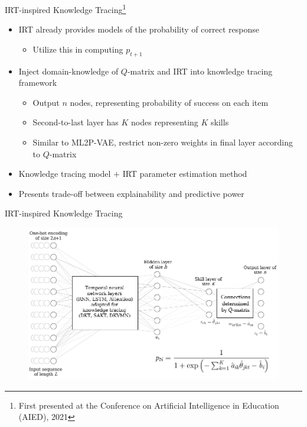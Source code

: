 \documentclass{beamer}
\theoremstyle{definition}
\begin{document}
\begin{frame}{IRT-inspired Knowledge Tracing\footnote{First presented at the Conference on Artificial Intelligence in Education (AIED), 2021}}
  \begin{itemize}
    \item IRT already provides models of the probability of correct response 
      \begin{itemize}
        \item Utilize this in computing $p_{t+1}$
      \end{itemize}
    \item<2-> Inject domain-knowledge of $Q$-matrix and IRT into knowledge tracing framework
      \begin{itemize}
        \item Output $n$ nodes, representing probability of success on each item
        \item Second-to-last layer has $K$ nodes representing $K$ skills
        \item Similar to ML2P-VAE, restrict non-zero weights in final layer according to $Q$-matrix
      \end{itemize}
    \item<3-> Knowledge tracing model $+$ IRT parameter estimation method
    \item<3-> Presents trade-off between explainability and predictive power
  \end{itemize}
\end{frame}

\begin{frame}{IRT-inspired Knowledge Tracing}
  \begin{figure}
  \includegraphics[width=.9\textwidth]{../img/kt_irt/kt_irt_visual_with_equation_2.png}
\end{figure}
\end{frame}
\end{document}
